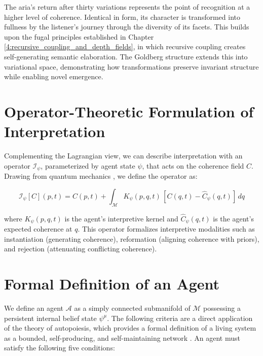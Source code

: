 The aria's return after thirty variations represents the point of recognition at a higher level of coherence. Identical in form, its character is transformed into fullness by the listener's journey through the diversity of its facets. This builds upon the fugal principles established in Chapter \ref{4:recursive_coupling_and_depth_fields}, in which recursive coupling creates self-generating semantic elaboration. The Goldberg structure extends this into variational space, demonstrating how transformations preserve invariant structure while enabling novel emergence.


\section{Operator-Theoretic Formulation of Interpretation}
\label{13.4:operator_theoretic_formulation_of_interpretation}

Complementing the Lagrangian view, we can describe interpretation with an operator \(\mathcal{I}_{\psi}\), parameterized by agent state \(\psi\), that acts on the coherence field \(C\). Drawing from quantum mechanics \autocite{vonNeumann1955}, we define the operator as:

\begin{equation}
\mathcal{I}_{\psi}[C](p, t) = C(p, t) + \int_{\mathcal{M}} K_{\psi}(p, q, t)\, [C(q, t) - \hat{C}_{\psi}(q, t)]\, dq
\end{equation}

where \(K_{\psi}(p, q, t)\) is the agent's interpretive kernel and \(\hat{C}_{\psi}(q, t)\) is the agent's expected coherence at \(q\). This operator formalizes interpretive modalities such as instantiation (generating coherence), reformation (aligning coherence with priors), and rejection (attenuating conflicting coherence).


\section{Formal Definition of an Agent}
\label{13.5:formal_definition_of_an_agent}

We define an agent \(\mathcal{A}\) as a simply connected submanifold of \(\mathcal{M}\) possessing a persistent internal belief state \(\psi^\mu\). The following criteria are a direct application of the theory of autopoiesis, which provides a formal definition of a living system as a bounded, self-producing, and self-maintaining network \autocite{MaturanaVarela1980}. An agent must satisfy the following five conditions:

